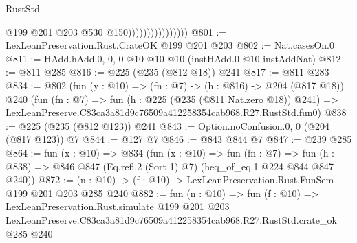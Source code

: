 \begin{lexlean}{RustStd}
\begin{coremodule}
                                    @199
                                    @201
                                    @203
                                    @530
                                    @150))))))))))))))))
@801 := LexLeanPreservation.Rust.CrateOK @199 @201 @203
@802 := Nat.casesOn.{0}
@811 := HAdd.hAdd.{0, 0, 0} @10 @10 @10 (instHAdd.{0} @10 instAddNat)
@812 := @811 @285
@816 := @225 (@235 (@812 @18)) @241
@817 := @811 @283
@834 := @802
    (fun (y : @10) => (fn : @7) -> (h : @816) -> @204 (@817 @18))
    @240
    (fun (fn : @7) =>
    fun (h : @225 (@235 (@811 Nat.zero @18)) @241) =>
    LexLeanPreserve.C83ca3a81d9c76509a412258354cab968.R27.RustStd.fun0)
@838 := @225 (@235 (@812 @123)) @241
@843 := Option.noConfusion.{0, 0} (@204 (@817 @123)) @7
@844 := @127 @7
@846 := @843 @844 @7
@847 := @239 @285
@864 := fun (x : @10) =>
  @834
    (fun (x : @10) =>
    fun (fn : @7) =>
    fun (h : @838) => @846 @847 (Eq.refl.{2} (Sort 1) @7) (heq_of_eq.{1} @224 @844 @847 @240))
@872 := (n : @10) -> (f : @10) -> LexLeanPreservation.Rust.FunSem @199 @201 @203 @285 @240
@882 := fun (n : @10) =>
  fun (f : @10) =>
  LexLeanPreservation.Rust.simulate
    @199
    @201
    @203
    LexLeanPreserve.C83ca3a81d9c76509a412258354cab968.R27.RustStd.crate_ok
    @285
    @240
\end{coremodule}
\end{lexlean}
